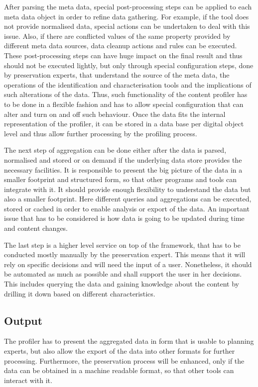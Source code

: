 After parsing the meta data, special post-processing steps can be applied to each meta data object in order to refine data gathering. For example, if the tool does not provide normalised data, special actions can be undertaken to deal with this issue. Also, if there are conflicted values of the same property provided by different meta data sources, data cleanup actions and rules can be executed. These post-processing steps can have huge impact on the final result and thus should not be executed lightly, but only through special configuration steps, done by preservation experts, that understand the source of the meta data, the operations of the identification and characterisation tools and the implications of such alterations of the data. Thus, such functionality of the content profiler has to be done in a flexible fashion and has to allow special configuration that can alter and turn on and off such behaviour. Once the data fits the internal representation of the profiler, it can be stored in a data base per digital object level and thus allow further processing by the profiling process.

The next step of aggregation can be done either after the data is parsed, normalised and stored or on demand if the underlying data store provides the necessary facilities. It is responsible to present the big picture of the data in a smaller footprint and structured form, so that other programs and tools can integrate with it. It should provide enough flexibility to understand the data but also a smaller footprint. Here different queries and aggregations can be executed, stored or cached in order to enable analysis or export of the data. An important issue that has to be considered is how data is going to be updated during time and content changes. 

The last step is a higher level service on top of the framework, that has to be conducted mostly manually by the preservation expert. This means that it will rely on specific decisions and will need the input of a user. Nonetheless, it should be automated as much as possible and shall support the user in her decisions. This includes querying the data and gaining knowledge about the content by drilling it down based on different characteristics.

\subsection{Output}
The profiler has to present the aggregated data in form that is usable to planning experts, but also allow the export of the data into other formats for further processing. Furthermore, the preservation process will be enhanced, only if the data
can be obtained in a machine readable format, so that other tools can interact with it.

